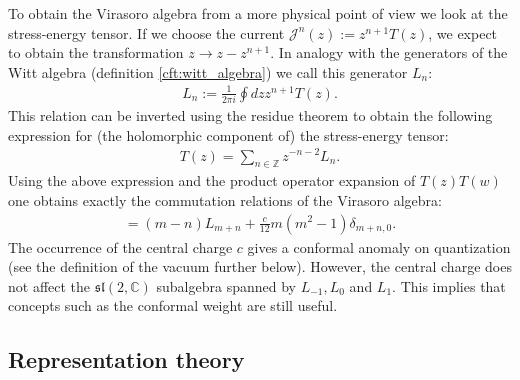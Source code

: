     To obtain the Virasoro algebra from a more physical point of view we look at the stress-energy tensor. If we choose the current $\mathcal{J}^n(z) := z^{n+1}T(z)$, we expect to obtain the transformation $z\longrightarrow z-z^{n+1}$. In analogy with the generators of the Witt algebra (definition \ref{cft:witt_algebra}) we call this generator $L_n$:
    \begin{gather}
        L_n := \frac{1}{2\pi i}\oint dzz^{n+1}T(z).
    \end{gather}
    This relation can be inverted using the residue theorem to obtain the following expression for (the holomorphic component of) the stress-energy tensor:
    \begin{gather}
        T(z) = \sum_{n\in\mathbb{Z}}z^{-n-2}L_n.
    \end{gather}
    Using the above expression and the product operator expansion of $T(z)T(w)$ one obtains exactly the commutation relations of the Virasoro algebra:
    \begin{gather}
        [L_m, L_n] = (m-n)L_{m+n} + \frac{c}{12}m(m^2-1)\delta_{m+n, 0}.
    \end{gather}
    The occurrence of the central charge $c$ gives a conformal anomaly on quantization (see the definition of the vacuum further below). However, the central charge does not affect the $\mathfrak{sl}(2, \mathbb{C})$ subalgebra spanned by $L_{-1}, L_0$ and $L_1$. This implies that concepts such as the conformal weight are still useful.

\subsection{Representation theory}



